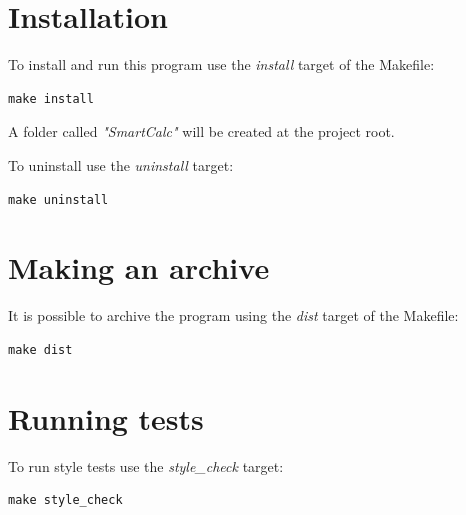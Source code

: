 \documentclass[a4paper, 12pt]{article}
\begin{document}
\begin{abstract}
{\parskip 10mm The deposit calculator counts accrued interest, tax amount and the deposit amount by the end of the term.}


\end{abstract}
\tableofcontents
\newpage

\section{Installation}
To install and run this program use the \textit{install} target of the Makefile:
\begin{verbatim}
make install
\end{verbatim}
A folder called \textit{"SmartCalc"} will be created at the project root.

To uninstall use the \textit{uninstall} target:
\begin{verbatim}
make uninstall
\end{verbatim}

\section{Making an archive}
It is possible to archive the program using the \textit{dist} target of the Makefile:
\begin{verbatim}
make dist
\end{verbatim}

\section{Running tests}
To run style tests use the \textit{style\_check} target:
\begin{verbatim}
make style_check
\end{verbatim}
\end{document}
